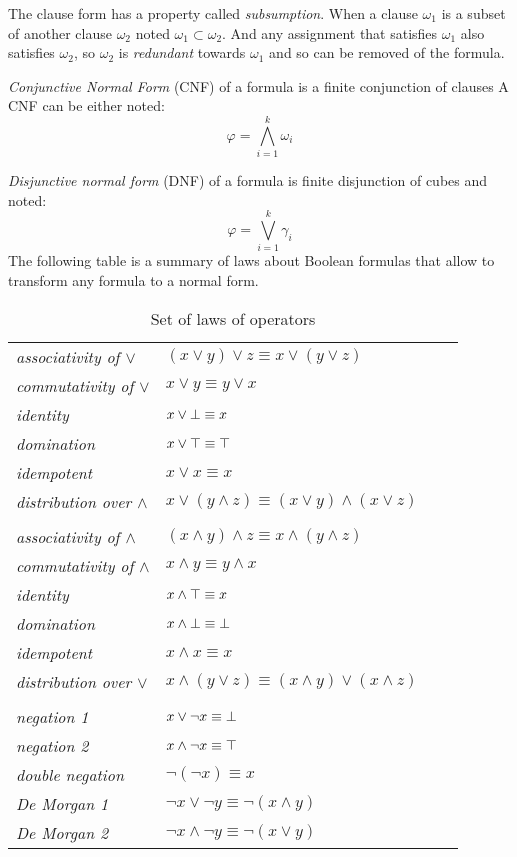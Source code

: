 The clause form has a property called \emph{subsumption}. 
When a clause $\omega_1$ is a subset of another clause $\omega_2$ noted $\omega_1 \subset \omega_2$. And any 
assignment that satisfies $\omega_1$ also satisfies $\omega_2$, so $\omega_2$ is \emph{redundant} towards $\omega_1$ and so can be removed of the formula.

\emph{Conjunctive Normal Form} (CNF) of a formula is a finite conjunction of clauses
 A CNF can be either noted:
  $$\varphi = \bigwedge_{i=1}^k \omega_i$$
  
\emph{Disjunctive normal form} (DNF) of a formula is finite disjunction of cubes and noted:
  $$\varphi = \bigvee_{i=1}^k \gamma_i$$
The following table is a summary of laws about Boolean formulas that allow to transform any formula to
a normal form.
\begin{table}[!htbp]
 \centering
 \begin{tabular}{lllc}
  
  \emph{associativity of $\lor$} & $(x \lor y) \lor z \equiv x \lor (y \lor z)$\\
  \emph{commutativity of $\lor$} & $x \lor y \equiv y \lor x$\\
  \emph{identity} & $x \lor \bot \equiv x$\\
  \emph{domination} & $x \lor \top \equiv \top$\\
  \emph{idempotent} & $x \lor x \equiv x$\\
  \emph{distribution over $\land$} & $x \lor (y \land z) \equiv (x \lor y) \land (x \lor z)$\\
  
  \\
  \emph{associativity of $\land$} & $(x \land y) \land z \equiv x \land (y \land z)$\\
  \emph{commutativity of $\land$} & $x \land y \equiv y \land x$\\
  \emph{identity} & $x \land \top \equiv x$\\
  \emph{domination} & $x \land \bot \equiv \bot$\\
  \emph{idempotent} & $x \land x \equiv x$\\
  \emph{distribution over $\lor$} & $x \land (y \lor z) \equiv (x \land y) \lor (x \land z)$\\
   \\
   \emph{negation 1} & $x \lor \neg x \equiv \bot$\\
    \emph{negation 2} & $x \land \neg x \equiv \top$\\
    
    \emph{double negation} & $\neg (\neg x) \equiv x$ \\
    \emph{De Morgan 1} & $\neg x \lor \neg y \equiv \neg (x \land y)$\\
    \emph{De Morgan 2} & $\neg x \land \neg y \equiv \neg (x \lor y)$\\
    
 \end{tabular}
 \caption{Set of laws of operators}
 \label{tab:laws}
\end{table}

